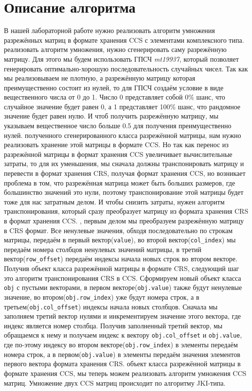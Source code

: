 \documentclass[14pt,a4paper,report]{ncc}
\begin{document}
	
	\section*{Описание алгоритма}
	В нашей лабораторной работе нужно реализовать алгоритм умножения разрежённых матриц в формате хранения CCS с элементами комплексного типа.
	 реализовать алгоритм умножения, нужно сгенерировать саму разрежённую матрицу. Для этого мы будем использовать ГПСЧ \textit{mt19937}, который позволяет генерировать оптимально-хорошую последовательность случайных чисел. Так как мы реализовываем не плотную, а разрежённую матрицу которая преимущественно состоит из нулей, то для ГПСЧ создаём условие в виде вещественного числа от 0 до 1. Число 0 представляет собой 0\% шанс, что случайное значение будет равен 0, а 1 представляет 100\% шанс, что рандомное значение будет равен нулю. И чтоб получить разрежённую матрицу, мы указываем вещественное число больше 0.5 для получения преимущественно нулей. 
	 полученного сгенерированного класса разрежённой матрицы, нам нужно реализовать хранение этой матрицы в формате CCS. Но так как перенос из разрежённой матрицы в формат хранения CCS увеличивает вычислительные затраты, то для их уменьшения, мы сначала должны транспонировать матрицу и перевести в формат хранения CRS, получая формат хранения CCS, но возникает проблема в том, что разрежённая матрица может быть больших размеров, где большинство значений это нули, поэтому транспонирование этой матрицы будет тоже для нас затратным делом. И чтобы снизить затраты, нужен алгоритм транспонирования, который сразу преобразует матрицу из формата хранения CRS в формат хранения CCS.
	, первым делом мы преобразуем разрежённую матрицу в CRS формат. Все ненулевые значения, обходя последовательно по строкам матрицы, передаём в первый вектор(\verb|value|), во второй вектор(\verb|col_index|) мы передаём номера столбцов ненулевых значений матрицы, в третий вектор(\verb|row_offset|) передаём индексы начала новых строк во втором векторе. Получив объект класса разрежённой матрицы в формате CRS, следующий шаг это алгоритм транспонирования CRS в CCS. Сформируем новый объект класса \verb|obj| с пустыми векторами, в первом векторе(\verb|obj.value|) также будут ненулевые значение, во втором(\verb|obj.row_index|) уже будут номера строк, а в третьем(\verb|obj.col_offset|) индексы начала новых столбцов. Сначала мы заполняем третий вектор  нулями и инкрементируем значение этого вектора, где индекс является номер столбца. Получив заполненный третий вектор, мы обращаемся к нему и получаем индекс к вектору \verb|obj.col_offset| и \verb|obj.value|, где по-этому индексу во втором векторе(\verb|obj.row_index|) в элементы передаём номера строк, а в первом(\verb|obj.value|) в элементы передаём значения элементов первого вектора формата хранения CRS.
	 объект класса разрежённой матрицы в формате хранения CCS, мы теперь можем реализовать алгоритм умножения CCS матриц. Умножение двух CCS матриц происходит по алгоритму JKI-типа.
	
\end{document}
